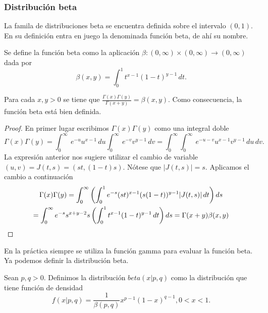 \documentclass{article}
\begin{document}
\subsubsection{Distribución beta}

La famila de distribuciones beta se encuentra definida sobre el intervalo $(0, 1)$. En su definición entra en juego la denominada función beta, de ahí su nombre.

\begin{definition}
    Se define la función beta como la aplicación $\beta : (0, \infty) \times (0, \infty) \to (0, \infty)$ dada por
    \[\beta(x, y) = \int_0^1 t^{x-1}(1-t)^{y-1}\,dt.\]
\end{definition}
\begin{prop} \label{prop:beta-gamma}
    Para cada $x, y > 0$ se tiene que $\frac{\Gamma(x)\Gamma(y)}{\Gamma(x+y)} = \beta(x,y)$. Como consecuencia, la función beta está bien definida.
\end{prop}
\begin{proof}
    En primer lugar escribimos $\Gamma(x)\Gamma(y)$ como una integral doble
    \begin{equation*}
        \Gamma(x)\Gamma(y) =\int_{0}^{\infty }\ e^{-u}u^{x-1}\,d u\int_{0}^{\infty }\ e^{-v}v^{y-1}\,d v
        =\int_{0}^{\infty }\int_{0}^{\infty }\ e^{-u-v}u^{x-1}v^{y-1}\,d u\,d v.
    \end{equation*}
    La expresión anterior nos sugiere utilizar el cambio de variable $(u, v) = J(t,s) = (st, (1-t)s)$. Nótese que $|J(t,s)| = s$. Aplicamos el cambio a continuación
    \begin{gather*}
        \Gamma(x)\Gamma(y) = \int_{0}^{\infty} \left( \int_{0}^{1}e^{-s}(st)^{x-1}(s(1-t))^{y-1}|J(t,s)|\, d t \right) ds \\
        = \int_{0}^{\infty }e^{-s}s^{x+y-2}s \left(\int_{0}^{1}t^{x-1}(1-t)^{y-1}\,dt \right) d s =\Gamma(x+y)\beta(x,y)  \qedhere
    \end{gather*}
\end{proof}

En la práctica siempre se utiliza la función gamma para evaluar la función beta. Ya podemos definir la distribución beta.

\begin{definition}
    Sean $p, q > 0$. Definimos la distribución $beta(x | p, q)$ como la distribución que tiene función de densidad
    \[f(x | p, q) = \frac{1}{\beta(p,q)}x^{p-1}(1-x)^{q-1}, 0 < x < 1.\]
\end{definition}
\end{document}
